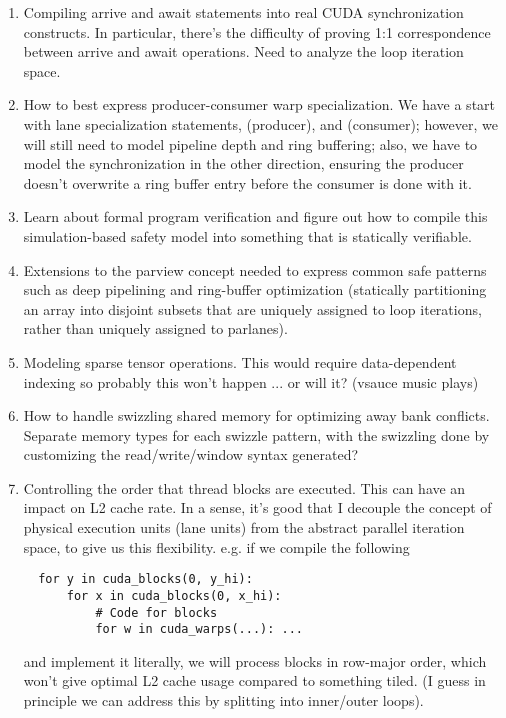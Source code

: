 \begin{enumerate}
  \item Compiling arrive and await statements into real CUDA synchronization constructs.
    In particular, there's the difficulty of proving 1:1 correspondence between arrive and await operations.
    Need to analyze the loop iteration space.
  \filbreak
  \item How to best express producer-consumer warp specialization.
    We have a start with lane specialization statements,  (producer), and  (consumer); however, we will still need to model pipeline depth and ring buffering; also, we have to model the synchronization in the other direction, ensuring the producer doesn't overwrite a ring buffer entry before the consumer is done with it.
  \filbreak
  \item Learn about formal program verification and figure out how to compile this simulation-based safety model into something that is statically verifiable.
  \filbreak
  \item Extensions to the parview concept needed to express common safe patterns such as deep pipelining and ring-buffer optimization (statically partitioning an array into disjoint subsets that are uniquely assigned to loop iterations, rather than uniquely assigned to parlanes).
  \filbreak
  \item Modeling sparse tensor operations. This would require data-dependent indexing so probably this won't happen ... or will it? (vsauce music plays)
  \filbreak
  \item How to handle swizzling shared memory for optimizing away bank conflicts.
    Separate memory types for each swizzle pattern, with the swizzling done by customizing the read/write/window syntax generated?
  \filbreak
  \item Controlling the order that thread blocks are executed.
  This can have an impact on L2 cache rate.
  In a sense, it's good that I decouple the concept of physical execution units (lane units) from the abstract parallel iteration space, to give us this flexibility. e.g. if we compile the following
  \filbreak
{
\color{lightttColor}
\begin{verbatim}
  for y in cuda_blocks(0, y_hi):
      for x in cuda_blocks(0, x_hi):
          # Code for blocks
          for w in cuda_warps(...): ...
\end{verbatim}
}
  \filbreak
  and implement it literally, we will process blocks in row-major order, which won't give optimal L2 cache usage compared to something tiled.
  (I guess in principle we can address this by splitting into inner/outer loops).
\end{enumerate}

